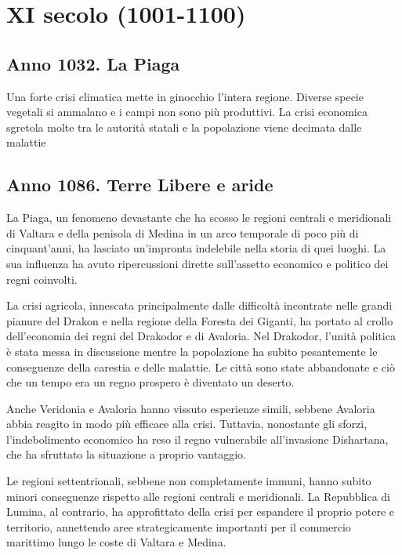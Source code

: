 \section{XI secolo (1001-1100)}\label{xi-secolo-1001-1100}

\subsection{Anno 1032. La Piaga}\label{anno-1032.-la-piaga}

Una forte crisi climatica mette in ginocchio l'intera regione. Diverse
specie vegetali si ammalano e i campi non sono più produttivi. La crisi
economica sgretola molte tra le autorità statali e la popolazione viene
decimata dalle malattie

\subsection{Anno 1086. Terre Libere e
aride}\label{anno-1086.-terre-libere-e-aride}

La Piaga, un fenomeno devastante che ha scosso le regioni centrali e
meridionali di Valtara e della penisola di Medina in un arco temporale
di poco più di cinquant'anni, ha lasciato un'impronta indelebile nella
storia di quei luoghi. La sua influenza ha avuto ripercussioni dirette
sull'assetto economico e politico dei regni coinvolti.

La crisi agricola, innescata principalmente dalle difficoltà incontrate
nelle grandi pianure del Drakon e nella regione della Foresta dei
Giganti, ha portato al crollo dell'economia dei regni del Drakodor e di
Avaloria. Nel Drakodor, l'unità politica è stata messa in discussione
mentre la popolazione ha subito pesantemente le conseguenze della
carestia e delle malattie. Le città sono state abbandonate e ciò che un
tempo era un regno prospero è diventato un deserto.

Anche Veridonia e Avaloria hanno vissuto esperienze simili, sebbene
Avaloria abbia reagito in modo più efficace alla crisi. Tuttavia,
nonostante gli sforzi, l'indebolimento economico ha reso il regno
vulnerabile all'invasione Dishartana, che ha sfruttato la situazione a
proprio vantaggio.

Le regioni settentrionali, sebbene non completamente immuni, hanno
subito minori conseguenze rispetto alle regioni centrali e meridionali.
La Repubblica di Lumina, al contrario, ha approfittato della crisi per
espandere il proprio potere e territorio, annettendo aree
strategicamente importanti per il commercio marittimo lungo le coste di
Valtara e Medina.

